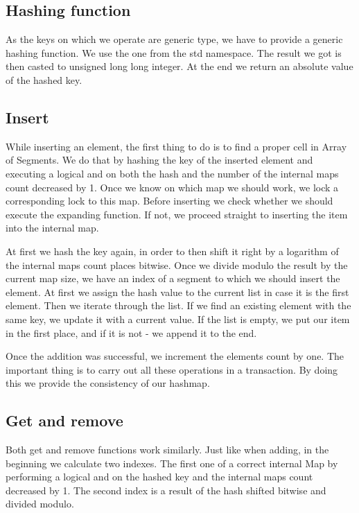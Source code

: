 \subsection{Hashing function}
    As the keys on which we operate are generic type, we have to provide a generic hashing function. We use the one from the std namespace. The result we got is then casted to unsigned long long integer. At the end we return an absolute value of the hashed key.  
    
\subsection{Insert}
    While inserting an element, the first thing to do is to find a proper cell in Array of Segments. We do that by hashing the key of the inserted element and executing a logical and on both the hash and the number of the internal maps count decreased by 1. Once we know on which map we should work, we lock a corresponding lock to this map. Before inserting we check whether we should execute the expanding function. If not, we proceed straight to inserting the item into the internal map.
        
    At first we hash the key again, in order to then shift it right by a logarithm of the internal maps count places bitwise. Once we divide modulo the result by the current map size, we have an index of a segment to which we should insert the element. At first we assign the hash value to the current list in case it is the first element. Then we iterate through the list. If we find an existing element with the same key, we update it with a current value. If the list is empty, we put our item in the first place, and if it is not - we append it to the end.
        
    Once the addition was successful, we increment the elements count by one. The important thing is to carry out all these operations in a transaction. By doing this we provide the consistency of our hashmap.
        
\subsection{Get and remove}
    Both get and remove functions work similarly. Just like when adding, in the beginning we calculate two indexes. The first one of a correct internal Map by performing a logical and on the hashed key and the internal maps count decreased by 1. The second index is a result of the hash shifted bitwise and divided modulo.
        
